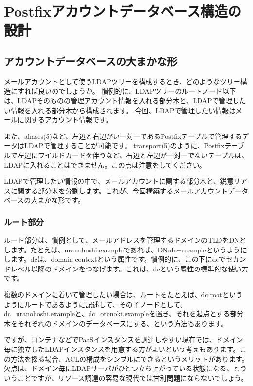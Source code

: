 \chapter{Postfixアカウントデータベース構造の設計}

\section{アカウントデータベースの大まかな形}

メールアカウントとして使うLDAPツリーを構成するとき、どのようなツリー構造にすれば良いのでしょうか。
慣例的に、LDAPツリーのルートノード以下は、LDAPそのものの管理アカウント情報を入れる部分木と、LDAPで管理したい情報を入れる部分木から構成されます。
今回、LDAPで管理したい情報はメールに関するアカウント情報です。

また、aliases(5)など、左辺と右辺がい一対一であるPostfixテーブルで管理するデータはLDAPで管理することが可能です。
transport(5)のように、Postfixテーブルで左辺にワイルドカードを伴うなど、右辺と左辺が一対一でないテーブルは、LDAPに入れることはできません。この点は注意をしてください。

LDAPで管理したい情報の中で、メールアカウントに関する部分木と、鋭意リアスに関する部分木を分割します。これが、今回構築するメールアカウントデータベースの大まかな形です。

\subsection{ルート部分}

ルート部分は、慣例として、メールアドレスを管理するドメインのTLDをDNとします。たとえば、uranohoshi.exampleであれば、DN:dc=exampleというようにします。dcは、domain contextという属性です。慣例的に、この下にdcでセカンドレベル以降のドメインをつなげます。これは、dcという属性の標準的な使い方です。

複数のドメインに着いて管理したい場合は、ルートをたとえば、dc:rootというようにルートであるように記述して、その子ノードとして、dc=uranohoshi.exampleと、dc=otonoki.exampleを置き、それを起点とする部分木をそれぞれのドメインのデータベースにする、という方法もあります。

ですが、コンテナなどでPaaSインスタンスを調達しやすい現在では、ドメイン毎に独立したLDAPインスタンスを用意する方がよいという考えもあります。この方法を採る場合、ACLの構成をシンプルにできるというメリットがあります。欠点は、ドメイン毎にLDAPサーバがひとつ立ち上がっている状態になる、とういうことですが、リソース調達の容易な現代では甘利問題にならないでしょう。


